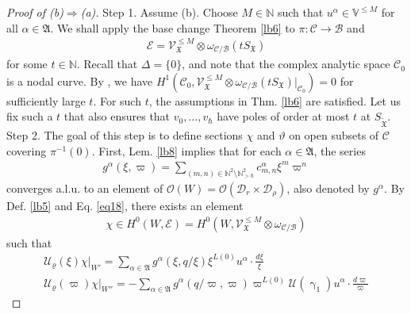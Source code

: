 \documentclass[11pt,b5paper,notitlepage]{article}
\theoremstyle{definition}
\theoremstyle{plain}
\newcommand{\fk}{\mathfrak}
\newcommand{\wtd}{\widetilde}
\newcommand{\scr}{\mathscr}
\newcommand{\SX}{{S_{\fk X}}}
\newcommand{\Vbb}{\mathbb V}
\newcommand{\Nbb}{\mathbb N}
\newcommand{\SXtd}{S_{\wtd{\fk X}}}
\newcommand{\<}{\left\langle}
\renewcommand{\>}{\right\rangle}
\newcommand{\MO}{\mathcal{O}}
\newcommand{\MU}{\mathcal{U}}
\newcommand{\MC}{\mathcal{C}}
\newcommand{\MB}{\mathcal{B}}
\newcommand{\fx}{\mathfrak{X}}
\newcommand{\MD}{\mathcal{D}}
\numberwithin{equation}{section}
\begin{document}
\begin{proof}[Proof of (b)$\Rightarrow$(a)]
Step 1. Assume (b). Choose $M\in\Nbb$ such that $u^\alpha\in\Vbb^{\leq M}$ for all $\alpha\in\fk A$. We shall apply the base change Theorem \ref{lb6} to $\pi:\MC\rightarrow\MB$ and
\begin{align*}
\scr E=\scr V^{\leq M}_\fx\otimes\omega_{\MC/\MB}(t\SX)
\end{align*}
for some $t\in\Nbb$. Recall that $\Delta=\{0\}$, and note that the complex analytic space $\MC_0$ is a nodal curve. By \cite[Thm. 2.3]{Gui-sewingconvergence}, we have $H^1(\MC_0,\scr V^{\leq M}_\fx\otimes\omega_{\MC/\MB}(t\SX)|_{\MC_0})=0$ for sufficiently large $t$. For such $t$, the assumptions in Thm. \ref{lb6} are satisfied. Let us fix such a $t$ that also ensures that $v_0,\dots,v_\hbar$ have poles of order at most $t$ at $\SXtd$.\\[-1ex]

Step 2. The goal of this step is to define sections $\chi$ and $\vartheta$ on open subsets of $\MC$ covering $\pi^{-1}(0)$. First,  Lem. \ref{lb8} implies that for each $\alpha\in\fk A$, the series
\begin{align*}
g^\alpha(\xi,\varpi)=\sum_{(m,n)\in\Nbb^2\setminus\Nbb_{>\hbar}^2} c^\alpha_{m,n}\xi^m\varpi^n
\end{align*}
converges a.l.u. to an element of $\MO(W)=\MO(\MD_r\times\MD_\rho)$, also denoted by $g^\alpha$. By Def. \ref{lb5} and Eq. \eqref{eq18}, there exists an element 
\begin{align*}
\chi\in H^0(W,\scr E)=H^0(W,\scr V_\fx^{\leq M}\otimes\omega_{\MC/\MB})
\end{align*}
such that
\begin{subequations}\label{eq25}
\begin{gather}
\MU_\varrho(\xi)\chi\big|_{W'}=\sum_{\alpha\in\fk A}g^\alpha(\xi,q/\xi)\xi^{L(0)}u^\alpha\cdot\frac{d\xi}\xi\\
\MU_\varrho(\varpi)\chi\big|_{W''}=-\sum_{\alpha\in\fk A} g^\alpha(q/\varpi,\varpi)\varpi^{L(0)}\MU(\upgamma_1)u^\alpha\cdot \frac{d\varpi}\varpi
\end{gather}
\end{subequations}



\end{proof}
\end{document}
